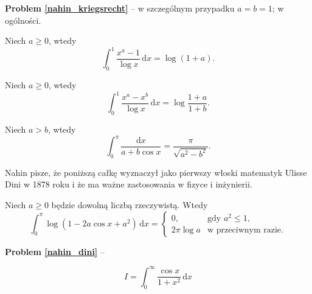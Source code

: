 \textbf{Problem \ref{nahin_kriegsrecht}} -- \cite[s. 67]{nahin15} w szczególnym przypadku $a = b = 1$; \cite[s. 114, 375]{nahin15} w ogólności. %

\begin{problem}
    Niech $a \ge 0$, wtedy
    \begin{equation}
        \int_0^1 \frac{x^a - 1}{\log x} \,\mathrm{d}x = \log(1+a).
    \end{equation}
\end{problem}

\begin{problem}
    Niech $a \ge 0$, wtedy
    \begin{equation}
        \int_0^1 \frac{x^a - x^b}{\log x} \,\mathrm{d}x = \log \frac{1+a}{1+b}.
    \end{equation}
\end{problem}

\begin{problem}
    Niech $a > b$, wtedy
    \begin{equation}
        \int_0^\pi \frac{\mathrm{d}x} {a + b \cos x} = \frac{\pi}{\sqrt{a^2 - b^2}}.
    \end{equation}
\end{problem}

Nahin pisze, że poniższą całkę wyznaczył jako pierwszy włoski matematyk Ulisse Dini w 1878 roku i że ma ważne zastosowania w fizyce i inżynierii.
%

\begin{problem}
    \label{nahin_dini}%
    Niech $a \ge 0$ będzie dowolną liczbą rzeczywistą.
    Wtedy
    \begin{equation}
        \int_0^\pi \log (1 - 2 a \cos x + a^2) \,\mathrm{d} x = \begin{cases}
            0, & \text{gdy } a^2 \le 1, \\
            2 \pi \log a & \textrm{w przeciwnym razie}.
        \end{cases}
    \end{equation}
\end{problem}

\textbf{Problem \ref{nahin_dini}} -- \cite[s. 109-112]{nahin15} %


\begin{equation}
    I = \int_0^\infty \frac {\cos x}{1+x^2} \,\mathrm{d}x
\end{equation}


%